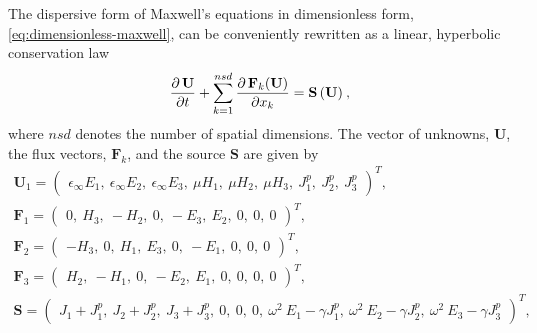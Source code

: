 The dispersive form of Maxwell's equations in dimensionless form, \eqref{eq:dimensionless-maxwell}, can be conveniently rewritten as a linear, hyperbolic conservation law \cite{Godlewski:2013tj,LeVeque:2002vc}
\begin{equation}
\frac{\partial  \, \mathbf{U}}{\partial t} + \sum_{k=1}^{nsd} \frac { \partial \, \mathbf{F}_k(\mathbf{U}) }{ \partial x_k } = \mathbf{S}\,(\mathbf{U}) \: ,
\label{maxwell-curl-equations-conservation-form}
\end{equation}
where $nsd$ denotes the number of spatial dimensions. The vector of unknowns, $\mathbf{U}$, the flux vectors, $\mathbf{F}_k$, and the source $\mathbf{S}$ are given by
\begin{equation*}
\begin{array}{c}
\mathbf{U}_1 =
  \begin{pmatrix}
    \epsilon_{\infty} E_1, \:
    \epsilon_{\infty} E_2 , \:
    \epsilon_{\infty} E_3 , \:
    \mu H_1 , \:
    \mu H_2 , \:
    \mu H_3 , \:
    J^p_1 , \:
    J^p_2 , \:
    J^p_3
\end{pmatrix}^T,
\\
\mathbf{F}_1 =
  \begin{pmatrix}
    0 ,\:
    H_3 ,\:
    -H_2 ,\:
    0 ,\:
    -E_3 ,\:
    E_2 ,\:
    0 ,\:
    0 ,\:
    0
  \end{pmatrix}^T , \\

\mathbf{F}_2 =
  \begin{pmatrix}
    - H_3 ,\:
    0 ,\:
    H_1 ,\:
    E_3 ,\:
    0 ,\:
    -E_1 ,\:
    0 ,\:
     0 ,\:
    0
  \end{pmatrix}^T , \\

\mathbf{F}_3 =
  \begin{pmatrix}
    H_2 ,\:
    -H_1 ,\:
    0 ,\:
    -E_2 ,\:
    E_1 ,\:
    0 ,\:
    0 ,\:
    0 ,\:
    0
  \end{pmatrix}^T , \\

\mathbf{S} =
  \begin{pmatrix}
    J_1 + J^p_1 ,\:
    J_2 + J^p_2 ,\:
    J_3 + J^p_3 ,\:
    0 ,\:
    0 ,\:
    0 ,\:
    \omega^2 \: E_1 - \gamma J^p_1 ,\:
    \omega^2 \: E_2 - \gamma J^p_2 ,\:
    \omega^2 \: E_3 - \gamma J^p_3
  \end{pmatrix}^T,

\end{array}
\end{equation*}

